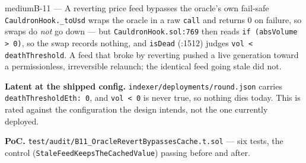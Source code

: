 \documentclass[11pt,a4paper]{article}
\newcommand{\code}[1]{\texttt{\small #1}}
\newcommand{\fileref}[1]{\texttt{\scriptsize #1}}
\begin{document}
\begin{findingbox}{medium}{B-11 --- A reverting price feed bypasses the oracle's own fail-safe}
\code{CauldronHook.\_toUsd} wraps the oracle in a raw \code{call} and returns 0 on
failure, so swaps do \emph{not} go down --- but \fileref{CauldronHook.sol:769} then reads
\code{if (absVolume > 0)}, so the swap records nothing, and \code{isDead} (:1512) judges
\code{vol < deathThreshold}. A feed that broke by reverting pushed a live generation
toward a permissionless, irreversible relaunch; the identical feed going stale did not.

\textbf{Latent at the shipped config.} \fileref{indexer/deployments/round.json} carries
\code{deathThresholdEth: 0}, and \code{vol < 0} is never true, so nothing dies today. This
is rated against the configuration the design intends, not the one currently deployed.

\textbf{PoC.} \fileref{test/audit/B11\_OracleRevertBypassesCache.t.sol} --- six tests, the
control (\code{StaleFeedKeepsTheCachedValue}) passing before and after.
\end{findingbox}
\end{document}
